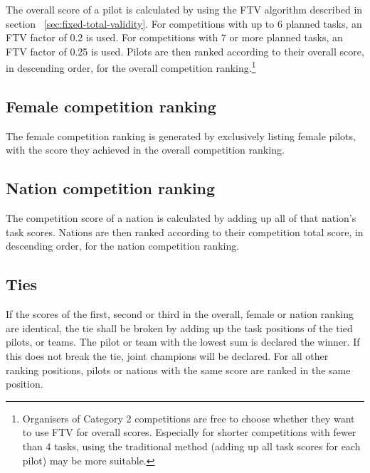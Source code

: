 \documentclass{article}
\begin{document}
The overall score of a pilot is calculated by using the FTV algorithm described
in section ~\ref{sec:fixed-total-validity}. For competitions with up to
6 planned tasks, an FTV factor of 0.2 is used. For competitions with 7 or more
planned tasks, an FTV factor of 0.25 is used. Pilots are then ranked according
to their overall score, in descending order, for the overall competition
ranking.\footnote{Organisers of Category 2 competitions are free to choose
whether they want to use FTV for overall scores. Especially for shorter
competitions with fewer than 4 tasks, using the traditional method (adding up
all task scores for each pilot) may be more suitable.}

\subsection{Female competition ranking}
The female competition ranking is generated by exclusively listing female
pilots, with the score they achieved in the overall competition ranking.

\subsection{Nation competition ranking}
The competition score of a nation is calculated by adding up all of that
nation’s task scores. Nations are then ranked according to their competition
total score, in descending order, for the nation competition ranking.

\subsection{Ties}
If the scores of the first, second or third in the overall, female or nation
ranking are identical, the tie shall be broken by adding up the task positions
of the tied pilots, or teams. The pilot or team with the lowest sum is declared
the winner. If this does not break the tie, joint champions will be declared.
For all other ranking positions, pilots or nations with the same score are
ranked in the same position.

\newpage
\end{document}
